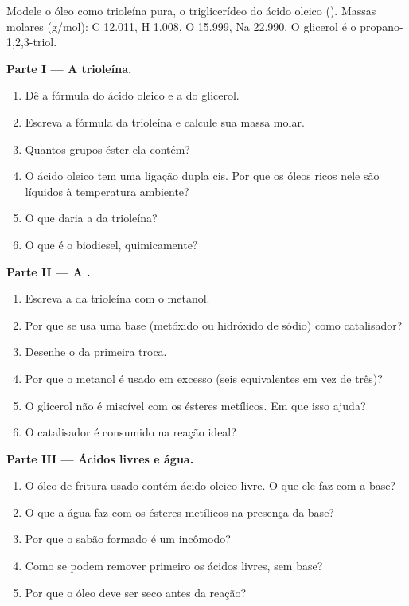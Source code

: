 \begin{problem}
\label{pb:b2:acyl-substitution:1}
Modele o óleo como trioleína pura, o triglicerídeo do ácido oleico (). Massas
molares (\unit{g/mol}): C 12.011, H 1.008, O 15.999, Na 22.990. O glicerol é o propano-1,2,3-triol.

\medskip
\noindent\textbf{Parte I --- A trioleína.}
\begin{enumerate}
  \item Dê a fórmula do ácido oleico e a do glicerol.
  \item Escreva a fórmula da trioleína e calcule sua massa molar.
  \item Quantos grupos éster ela contém?
  \item O ácido oleico tem uma ligação dupla cis. Por que os óleos ricos nele são líquidos à temperatura ambiente?
  \item O que daria a  da trioleína?
  \item O que é o biodiesel, quimicamente?
\end{enumerate}

\medskip
\noindent\textbf{Parte II --- A .}
\begin{enumerate}[resume]
  \item Escreva a  da trioleína com o metanol.
  \item Por que se usa uma base (metóxido ou hidróxido de sódio) como catalisador?
  \item Desenhe o  da primeira troca.
  \item Por que o metanol é usado em excesso (seis equivalentes em vez de três)?
  \item O glicerol não é miscível com os ésteres metílicos. Em que isso ajuda?
  \item O catalisador é consumido na reação ideal?
\end{enumerate}

\medskip
\noindent\textbf{Parte III --- Ácidos livres e água.}
\begin{enumerate}[resume]
  \item O óleo de fritura usado contém ácido oleico livre. O que ele faz com a base?
  \item O que a água faz com os ésteres metílicos na presença da base?
  \item Por que o sabão formado é um incômodo?
  \item Como se podem remover primeiro os ácidos livres, sem base?
  \item Por que o óleo deve ser seco antes da reação?
\end{enumerate}


\end{problem}
